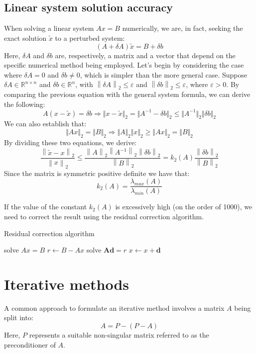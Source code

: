 \documentclass[12pt, a4paper]{report}
\begin{document}
    \subsection{Linear system solution accuracy}
    When solving a linear system $Ax=B$ numerically, we are, in fact, seeking the exact solution $\widetilde{x}$ to a perturbed system:
    \[\left( A + \delta A\right)\widetilde{x}=B+\delta b\]
    Here, $\delta A$ and $\delta b$ are, respectively, a matrix and a vector that depend on the specific numerical method being employed.
    Let's begin by considering the case where $\delta A=0$ and $\delta b\neq 0$, which is simpler than the more general case.
    Suppose $\delta A \in \mathbb{R}^{n \times n}$ and $\delta b \in \mathbb{R}^{n}$, with $\left\lVert \delta A \right\rVert_2 \leq \varepsilon$ and $\left\lVert \delta b \right\rVert_2 \leq \varepsilon$, where $\varepsilon > 0$. 
    By comparing the previous equation with the general system formula, we can derive the following:
    \[A\left(x-\widetilde{x}\right)=\delta b\Rightarrow\Vert x-\widetilde{x} \Vert_2=\Vert A^{-1}-\delta b \Vert_2 \leq \Vert A^{-1} \Vert_2 \Vert \delta b \Vert_2\]
    We can also establish that:
    \[\Vert Ax\Vert_2=\Vert B\Vert_2 \Rightarrow \Vert A \Vert_2\Vert x \Vert_2 \geq \Vert Ax\Vert_2=\Vert B\Vert_2\]
    By dividing these two equations, we derive:
    \[\dfrac{\left\lVert \widetilde{x}-x \right\rVert_2}{\left\lVert x \right\rVert_2} \leq \dfrac{\left\lVert A \right\rVert_2\left\lVert A^{-1} \right\rVert_2\left\lVert \delta b \right\rVert_2}{\left\lVert B \right\rVert_2}=k_2(A)\dfrac{\left\lVert \delta b \right\rVert_2}{\left\lVert B \right\rVert_2}\]
    Since the matrix is symmetric positive definite we have that: 
    \[k_2(A)=\dfrac{\lambda_{max}(A)}{\lambda_{min}(A)}\]

    If the value of the constant $k_2(A)$ is excessively high (on the order of 1000), we need to correct the result using the residual correction algorithm.
    \begin{algorithm}[H]
        \caption{Residual correction algorithm}
            \begin{algorithmic}[1]
                \State solve $ Ax=B$
                \State $r \leftarrow B- Ax$
                \State solve $\boldsymbol{Ad}=r$
                \State $x \leftarrow x+\boldsymbol{d}$
            \end{algorithmic}
    \end{algorithm}

    \section{Iterative methods}
    A common approach to formulate an iterative method involves a matrix $A$ being split into:
    \[A=P-\left(P-A\right)\]
    Here, $P$ represents a suitable non-singular matrix referred to as the preconditioner of $A$.
\end{document}
